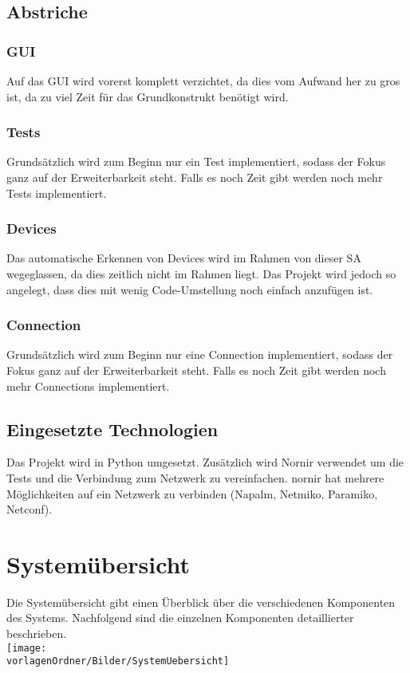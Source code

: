 \documentclass[
	ngerman,
	toc=listof, %
	toc=bibliography, %
	footnotes=multiple, %
	parskip=half, %
	numbers=noendperiod %
]{scrartcl}
\newcommand{\vorlagenOrdner}{../../99_Vorlagen} %
\begin{document}
	\subsection{Abstriche}
		\subsubsection{GUI}
			Auf das GUI wird vorerst komplett verzichtet, da dies vom Aufwand her zu gros ist, da zu viel Zeit für das Grundkonstrukt benötigt wird.

		\subsubsection{Tests}
			Grundsätzlich wird zum Beginn nur ein Test implementiert, sodass der Fokus ganz auf der Erweiterbarkeit steht. Falls es noch Zeit gibt werden noch mehr Tests implementiert.

		\subsubsection{Devices}
			Das automatische Erkennen von Devices wird im Rahmen von dieser SA wegeglassen, da dies zeitlich nicht im Rahmen liegt. Das Projekt wird jedoch so angelegt, dass dies mit wenig Code-Umstellung noch einfach anzufügen ist.

		\subsubsection{Connection}
			Grundsätzlich wird zum Beginn nur eine Connection implementiert, sodass der Fokus ganz auf der Erweiterbarkeit steht. Falls es noch Zeit gibt werden noch mehr Connections implementiert.

	\subsection{Eingesetzte Technologien}
		Das Projekt wird in Python umgesetzt. Zusätzlich wird Nornir verwendet um die Tests und die Verbindung zum Netzwerk zu vereinfachen. nornir hat mehrere Möglichkeiten auf ein Netzwerk zu verbinden (Napalm, Netmiko, Paramiko, Netconf).


\section{Systemübersicht}
	Die Systemübersicht gibt einen Überblick über die verschiedenen Komponenten des Systems. Nachfolgend sind die einzelnen Komponenten detaillierter beschrieben.\\
	\texttt{[image: \\vorlagenOrdner/Bilder/SystemUebersicht]}
\end{document}
